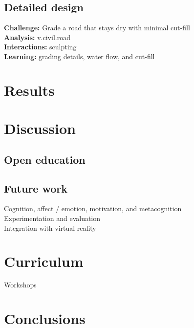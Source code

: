 \documentclass[final,3p,times,twocolumn]{elsarticle}
\begin{document}
\subsection{Detailed design}
\noindent
\textbf{Challenge:} Grade a road that stays dry with minimal cut-fill \\ %
\textbf{Analysis:} v.civil.road \\
\textbf{Interactions:} sculpting  \\
\textbf{Learning:} grading details, water flow, and cut-fill\\

\section{Results}\label{results}

\section{Discussion}\label{discussion}
\subsection{Open education}

\subsection{Future work}
\noindent
Cognition, affect / emotion, motivation, and metacognition \\
Experimentation and evaluation \\
Integration with virtual reality \\

\section{Curriculum}\label{curriculum}
Workshops

\section{Conclusions}\label{conclusion}
\end{document}
